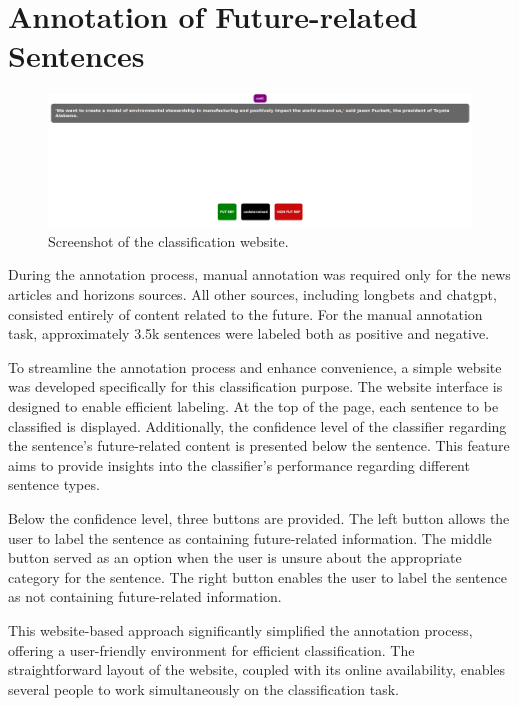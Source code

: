 \documentclass[a4paper,12pt]{report} %
\begin{document}
\section{Annotation of Future-related Sentences}
\begin{figure}
  \centering
  \includegraphics[width=16cm]{img/classification_website.png}
  \caption{Screenshot of the classification website.}
  \label{fig:classification_website}
\end{figure}
During the annotation process, manual annotation was required only for the news articles and horizons sources. All other sources, including longbets and chatgpt, consisted entirely of content related to the future. For the manual annotation task, approximately 3.5k sentences were labeled both as positive and negative.

To streamline the annotation process and enhance convenience, a simple website was developed specifically for this classification purpose. The website interface is designed to enable efficient labeling. At the top of the page, each sentence to be classified is displayed. Additionally, the confidence level of the classifier regarding the sentence's future-related content is presented below the sentence. This feature aims to provide insights into the classifier's performance regarding different sentence types.

Below the confidence level, three buttons are provided. The left button allows the user to label the sentence as containing future-related information. The middle button served as an option when the user is unsure about the appropriate category for the sentence. The right button enables the user to label the sentence as not containing future-related information.

This website-based approach significantly simplified the annotation process, offering a user-friendly environment for efficient classification. The straightforward layout of the website, coupled with its online availability, enables several people to work simultaneously on the classification task.
\end{document}
